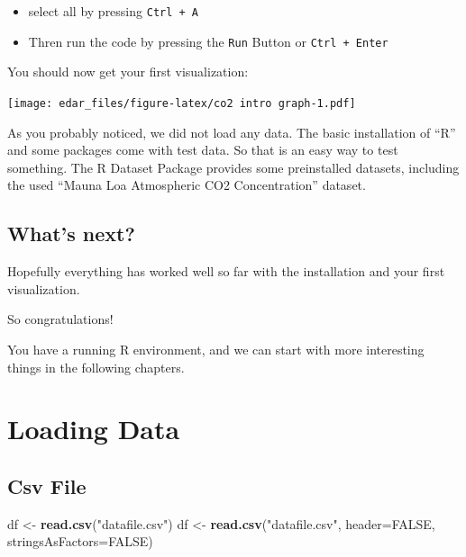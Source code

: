 \documentclass[
]{book}
\newenvironment{Shaded}{\begin{snugshade}}{\end{snugshade}}
\newcommand{\DataTypeTok}[1]{\textcolor[rgb]{0.13,0.29,0.53}{#1}}
\newcommand{\KeywordTok}[1]{\textcolor[rgb]{0.13,0.29,0.53}{\textbf{#1}}}
\newcommand{\NormalTok}[1]{#1}
\newcommand{\OtherTok}[1]{\textcolor[rgb]{0.56,0.35,0.01}{#1}}
\newcommand{\StringTok}[1]{\textcolor[rgb]{0.31,0.60,0.02}{#1}}
\let\oldShaded\Shaded
\let\endoldShaded\endShaded
\renewenvironment{Shaded}{\footnotesize\oldShaded}{\endoldShaded}
\begin{document}
\begin{itemize}
\item
  select all by pressing \texttt{Ctrl\ +\ A}
\item
  Thren run the code by pressing the \texttt{Run} Button or \texttt{Ctrl\ +\ Enter}
\end{itemize}

You should now get your first visualization:

\texttt{[image: edar\_files/figure-latex/co2 intro graph-1.pdf]}

As you probably noticed, we did not load any data. The basic installation of ``R'' and some packages come with test data. So that is an easy way to test something. The R Dataset Package provides some preinstalled datasets, including the used ``Mauna Loa Atmospheric CO2 Concentration'' dataset.

\hypertarget{whats-next}{%
\section{What's next?}\label{whats-next}}

Hopefully everything has worked well so far with the installation and your first visualization.

So congratulations!

You have a running R environment, and we can start with more interesting things in the following chapters.

\hypertarget{loading-data}{%
\chapter{Loading Data}\label{loading-data}}

\hypertarget{csv-file}{%
\section{Csv File}\label{csv-file}}

\begin{Shaded}
\begin{Highlighting}[]
\NormalTok{df <-}\StringTok{ }\KeywordTok{read.csv}\NormalTok{(}\StringTok{"datafile.csv"}\NormalTok{)}
\NormalTok{df <-}\StringTok{ }\KeywordTok{read.csv}\NormalTok{(}\StringTok{"datafile.csv"}\NormalTok{, }\DataTypeTok{header=}\OtherTok{FALSE}\NormalTok{, }\DataTypeTok{stringsAsFactors=}\OtherTok{FALSE}\NormalTok{)}
\end{Highlighting}
\end{Shaded}
\end{document}
